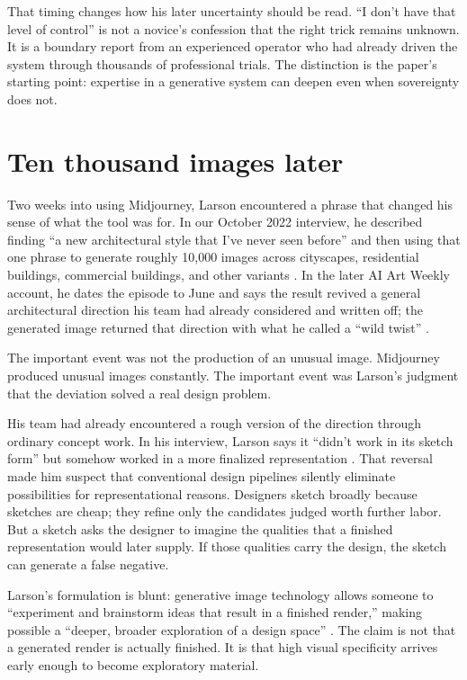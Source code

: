 \documentclass[11pt]{article}
\begin{document}
That timing changes how his later uncertainty should be read. ``I don't have that level of control'' is not a novice's confession that the right trick remains unknown. It is a boundary report from an experienced operator who had already driven the system through thousands of professional trials. The distinction is the paper's starting point: expertise in a generative system can deepen even when sovereignty does not.

\section{Ten thousand images later}
Two weeks into using Midjourney, Larson encountered a phrase that changed his sense of what the tool was for. In our October 2022 interview, he described finding ``a new architectural style that I've never seen before'' and then using that one phrase to generate roughly 10,000 images across cityscapes, residential buildings, commercial buildings, and other variants \cite{Larson2022}. In the later AI Art Weekly account, he dates the episode to June and says the result revived a general architectural direction his team had already considered and written off; the generated image returned that direction with what he called a ``wild twist'' \cite{AIArtWeeklyLarson2023}.

The important event was not the production of an unusual image. Midjourney produced unusual images constantly. The important event was Larson's judgment that the deviation solved a real design problem.

His team had already encountered a rough version of the direction through ordinary concept work. In his interview, Larson says it ``didn't work in its sketch form'' but somehow worked in a more finalized representation \cite{Larson2022}. That reversal made him suspect that conventional design pipelines silently eliminate possibilities for representational reasons. Designers sketch broadly because sketches are cheap; they refine only the candidates judged worth further labor. But a sketch asks the designer to imagine the qualities that a finished representation would later supply. If those qualities carry the design, the sketch can generate a false negative.

Larson's formulation is blunt: generative image technology allows someone to ``experiment and brainstorm ideas that result in a finished render,'' making possible a ``deeper, broader exploration of a design space'' \cite{Larson2022}. The claim is not that a generated render is actually finished. It is that high visual specificity arrives early enough to become exploratory material.
\end{document}
